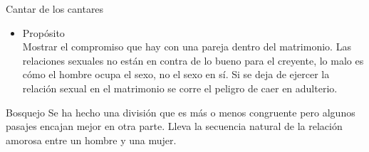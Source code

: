 \begin{section}{Cantar de los cantares}
\begin{itemize}
			La unión conyugal.\\
			Se refiere a la unión sexual que hay dentro del matrimonio, que debe de haber entre 2 esposos pues así lo estableció Dios. En el matrimonio es necesario que haya una entrega recíproca, la relación sexual también es una obligación.
		\item Propósito\\
			Mostrar el compromiso que hay con una pareja dentro del matrimonio. Las relaciones sexuales no están en contra de lo bueno para el creyente, lo malo es cómo el hombre ocupa el sexo, no el sexo en sí. Si se deja de ejercer la relación sexual en el matrimonio se corre el peligro de caer en adulterio.
	\end{itemize}
	\begin{subsection}{Bosquejo}
	Se ha hecho una división que es más o menos congruente pero algunos pasajes encajan mejor en otra parte.
	\newpage
	Lleva la secuencia natural de la relación amorosa entre un hombre y una mujer.\\


\end{subsection}
\end{section}

